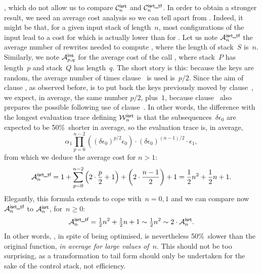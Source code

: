  \leqslant
{}\), which do not allow us to compare
\(\C{\fun{isrt}}{n}\) and \(\C{\smash[t]{\fun{isrt\_tf}}}{n}\). In
order to obtain a stronger result, we need an average cost analysis so
we can tell apart  from . Indeed,
it might be that, for a given input stack of length~\(n\), most
configurations of the input lead to a cost for 
which is actually lower than for . Let us note
\(\M{\smash[t]{\fun{isrt\_tf}}}{n}\) the average number of rewrites
needed to compute , where the length of
stack~\(S\) is~\(n\). Similarly, we note \(\M{\fun{ins}}{p,q}\) for
the average cost of the call , where
stack~\(P\) has length~\(p\) and stack~\(Q\) has length~\(q\). The
short story is this: because the keys are random, the average number
of times clause~\clause{\delta} is used is~\(p/2\). Since the aim of
clause , as observed before, is to put back the
keys previously moved by clause~\clause{\delta}, we expect, in
average, the same number \(p/2\), plus~\(1\), because
clause~ also prepares the possible following use of
clause~\clause{\delta}. In other words, the difference with the
longest evaluation trace defining \(\W{\fun{isrt}}{n}\) is that the
subsequences~\(\delta\epsilon_0\) are expected to be 50\%~shorter in
average, so the evaluation trace is, in average,
\begin{equation*}
\alpha_1\prod_{p=0}^{n-2}{\left((\delta\epsilon_0)^{p/2}\epsilon_0\right)}
\cdot (\delta\epsilon_0)^{(n-1)/2} \cdot \epsilon_1,
\end{equation*}
from which we deduce the average cost for \(n>1\):
\begin{equation*}
  \M{\fun{isrt\_tf}}{n} = 1 +
  \sum_{p=0}^{n-2}{\left(2\cdot\frac{p}{2}+1\right)}
                       + \left(2\cdot\frac{n-1}{2}\right) + 1
                     = \frac{1}{2}{n^2} + \frac{1}{2}{n} + 1.
\end{equation*}
Elegantly, this formula extends to cope with~\(n=0,1\) and we can
compare now \(\M{\fun{isrt\_tf}}{n}\) to \(\M{\fun{isrt}}{n}\),
for~\(n\geqslant{}0\):
\begin{equation*}
\M{\fun{isrt\_tf}}{n}
  = \tfrac{1}{2}{n^2} + \tfrac{1}{2}{n} + 1
  \sim \tfrac{1}{2}{n^2} \sim 2 \cdot \M{\fun{isrt}}{n}.
\end{equation*}
In other words, , in spite of being optimised, is
nevertheless 50\%~slower than the original function, \emph{in average
  for large values of~\(n\)}. This should not be too surprising, as
a transformation to tail form should only be undertaken for the sake
of the control stack, not efficiency.

